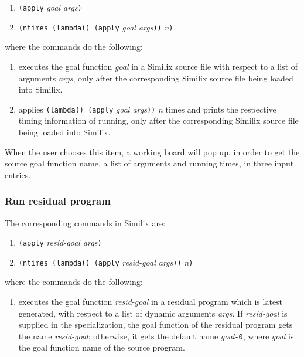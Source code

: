 \begin{sloppypar}
\begin{enumerate}
\item {\tt (apply} {\it goal args}{\tt )}
\item {\tt (ntimes (lambda() (apply} {\it goal args}{\tt ))} {\it  n}{\tt )}
\end{enumerate}

\noindent where the commands do the following:

\begin{enumerate}
\item executes the goal function {\it goal} in a Similix source file with
   respect to a list of arguments {\it args}, only after the
   corresponding Similix source file being loaded into Similix.

\item applies {\tt (lambda() (apply} {\it goal args}{\tt ))} {\it n} times
   and prints the respective timing information of running, only after
   the corresponding Similix source file being loaded into Similix.
\end{enumerate}
\medskip
\par
   When the user chooses this item, a working board will pop up, in
order to get the source goal function name, a list of arguments and
running times, in three input entries.


\subsubsection{Run residual program}


The corresponding commands in Similix are:

\begin{enumerate}
\item {\tt (apply} {\it resid-goal args}{\tt )}
\item {\tt (ntimes (lambda() (apply}
      {\it resid-goal args}{\tt ))} {\it n}{\tt )}
\end{enumerate}
\noindent where the commands do the following:

\begin{enumerate}
\item executes the goal function {\it resid-goal} in a residual program
   which is latest generated, with respect to a list of dynamic
   arguments {\it args}. If {\it resid-goal} is supplied in the
   specialization, the goal function of the residual program gets the
   name {\it resid-goal}; otherwise, it gets the default name {\it
   goal}{\tt -0}, where {\it goal} is the goal function name of the
   source program.


\end{enumerate}
\end{sloppypar}
